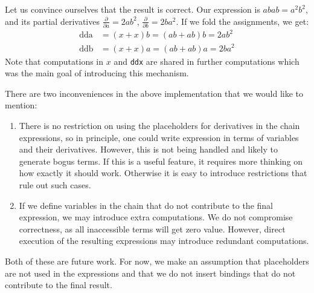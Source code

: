{
Let us convince ourselves that the result is correct.  Our expression is $abab = a^2b^2$,
and its partial derivatives $\frac{\partial}{\partial a} = 2ab^2$,
$\frac{\partial}{\partial b} = 2ba^2$.  If we fold the assignments, we get:
\begin{eqnarray*}
   \text{dda} &= (x + x)b = (ab + ab)b = 2ab^2\\
   \text{ddb} &= (x + x)a = (ab + ab)a = 2ba^2
\end{eqnarray*}
Note that computations in $x$ and \texttt{ddx} are shared in further computations
which was the main goal of introducing this mechanism.

There are two inconveniences in the above implementation that we would like to
mention:
\begin{enumerate}
\item There is no restriction on using the placeholders for derivatives in the 
chain expressions, so in principle, one could write expression in terms of
variables and their derivatives.  However, this is not being handled and likely
to generate bogus terms.  If this is a useful feature, it requires more thinking
on how exactly it should work.  Otherwise it is easy to introduce restrictions
that rule out such cases.
\item If we define variables in the chain that do not contribute to the final
expression, we may introduce extra computations.  We do not compromise correctness,
as all inaccessible terms will get zero value.  However, direct execution of the
resulting expressions may introduce redundant computations.
\end{enumerate}
Both of these are future work.  For now, we make an assumption that placeholders
are not used in the expressions and that we do not insert bindings that do not
contribute to the final result.

}
